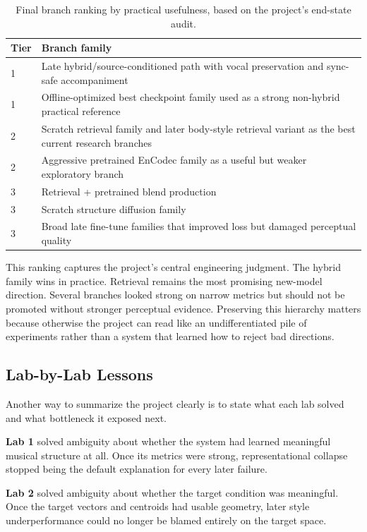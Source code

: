 \documentclass[conference]{IEEEtran}
\begin{document}
\begin{table}[t]
\caption{Final branch ranking by practical usefulness, based on the project's end-state audit.}
\label{tab:ranking}
\centering
\small
\begin{tabular}{@{}p{1.0cm}p{5.4cm}@{}}
\toprule
\textbf{Tier} & \textbf{Branch family} \\
\midrule
1 & Late hybrid/source-conditioned path with vocal preservation and sync-safe accompaniment \\
1 & Offline-optimized best checkpoint family used as a strong non-hybrid practical reference \\
2 & Scratch retrieval family and later body-style retrieval variant as the best current research branches \\
2 & Aggressive pretrained EnCodec family as a useful but weaker exploratory branch \\
3 & Retrieval + pretrained blend production \\
3 & Scratch structure diffusion family \\
3 & Broad late fine-tune families that improved loss but damaged perceptual quality \\
\bottomrule
\end{tabular}
\end{table}

This ranking captures the project's central engineering judgment. The hybrid family wins in practice. Retrieval remains the most promising new-model direction. Several branches looked strong on narrow metrics but should not be promoted without stronger perceptual evidence. Preserving this hierarchy matters because otherwise the project can read like an undifferentiated pile of experiments rather than a system that learned how to reject bad directions.

\subsection{Lab-by-Lab Lessons}
Another way to summarize the project clearly is to state what each lab solved and what bottleneck it exposed next.

\textbf{Lab 1} solved ambiguity about whether the system had learned meaningful musical structure at all. Once its metrics were strong, representational collapse stopped being the default explanation for every later failure.

\textbf{Lab 2} solved ambiguity about whether the target condition was meaningful. Once the target vectors and centroids had usable geometry, later style underperformance could no longer be blamed entirely on the target space.
\end{document}

